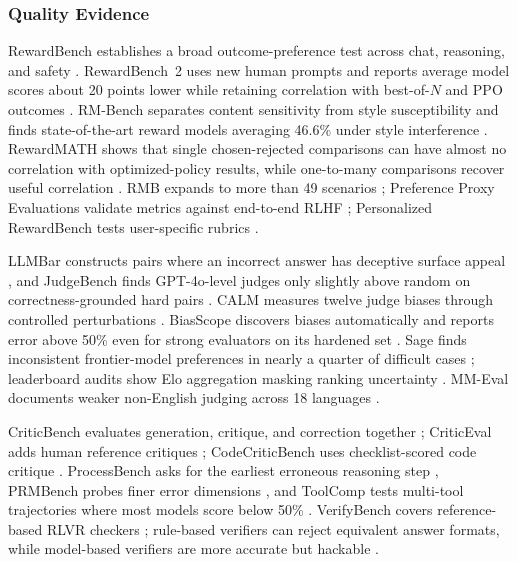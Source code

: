 \subsubsection{Quality Evidence}
\label{supp:evaluation-quality}

RewardBench establishes a broad outcome-preference test across chat, reasoning, and safety \citep{lambert2024rewardbench}. RewardBench~2 uses new human prompts and reports average model scores about 20 points lower while retaining correlation with best-of-$N$ and PPO outcomes \citep{malik2025rewardbench}. RM-Bench separates content sensitivity from style susceptibility and finds state-of-the-art reward models averaging 46.6\% under style interference \citep{liu2024rmbench}. RewardMATH shows that single chosen-rejected comparisons can have almost no correlation with optimized-policy results, while one-to-many comparisons recover useful correlation \citep{kim2024evaluating}. RMB expands to more than 49 scenarios \citep{zhou2024rmb}; Preference Proxy Evaluations validate metrics against end-to-end RLHF \citep{frick2024how}; Personalized RewardBench tests user-specific rubrics \citep{ma2026personalized}.

LLMBar constructs pairs where an incorrect answer has deceptive surface appeal \citep{zeng2023evaluating}, and JudgeBench finds GPT-4o-level judges only slightly above random on correctness-grounded hard pairs \citep{tan2024judgebench}. CALM measures twelve judge biases through controlled perturbations \citep{ye2024justice}. BiasScope discovers biases automatically and reports error above 50\% even for strong evaluators on its hardened set \citep{lai2026biasscope}. Sage finds inconsistent frontier-model preferences in nearly a quarter of difficult cases \citep{feng2025are}; leaderboard audits show Elo aggregation masking ranking uncertainty \citep{feuer2025when}. MM-Eval documents weaker non-English judging across 18 languages \citep{son2024mmeval}.

CriticBench evaluates generation, critique, and correction together \citep{lin2024criticbench}; CriticEval adds human reference critiques \citep{lan2024criticeval}; CodeCriticBench uses checklist-scored code critique \citep{zhang2025codecriticbench}. ProcessBench asks for the earliest erroneous reasoning step \citep{zheng2024processbench}, PRMBench probes finer error dimensions \citep{song2025prmbench}, and ToolComp tests multi-tool trajectories where most models score below 50\% \citep{nath2025toolcomp}. VerifyBench covers reference-based RLVR checkers \citep{yan2025verifybench}; rule-based verifiers can reject equivalent answer formats, while model-based verifiers are more accurate but hackable \citep{huang2025from}.

